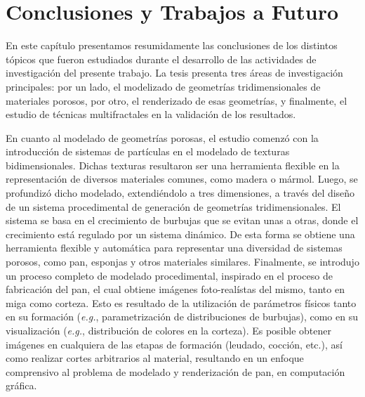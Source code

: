 \chapter{Conclusiones y Trabajos a Futuro}
En este capítulo presentamos resumidamente las conclusiones de los distintos tópicos que fueron estudiados durante el desarrollo de las actividades de investigación del presente trabajo.
La tesis presenta tres áreas de investigación principales: por un lado, el modelizado de geometrías tridimensionales de materiales porosos, por otro, el renderizado de esas geometrías, y finalmente, el estudio de técnicas multifractales en la validación de los resultados.

En cuanto al modelado de geometrías porosas, el estudio comenzó con la introducción de sistemas de partículas en el modelado de texturas bidimensionales.
Dichas texturas resultaron ser una herramienta flexible en la representación de diversos materiales comunes, como madera o mármol.
Luego, se profundizó dicho modelado, extendiéndolo a tres dimensiones, a través del diseño de un sistema procedimental de generación de geometrías tridimensionales.
El sistema se basa en el crecimiento de burbujas que se evitan unas a otras, donde el crecimiento está regulado por un sistema dinámico.
De esta forma se obtiene una herramienta flexible y automática para representar una diversidad de sistemas porosos, como pan, esponjas y otros materiales similares.
Finalmente, se introdujo un proceso completo de modelado procedimental, inspirado en el proceso de fabricación del pan, el cual obtiene imágenes foto-realístas del mismo, tanto en miga como corteza.
Esto es resultado de la utilización de parámetros físicos tanto en su formación ({\em e.g.}, parametrización de distribuciones de burbujas), como en su visualización ({\em e.g.}, distribución de colores en la corteza).
Es posible obtener imágenes en cualquiera de las etapas de formación (leudado, cocción, etc.), así como realizar cortes arbitrarios al material, resultando en un enfoque comprensivo al problema de modelado y renderización de pan, en computación gráfica.

